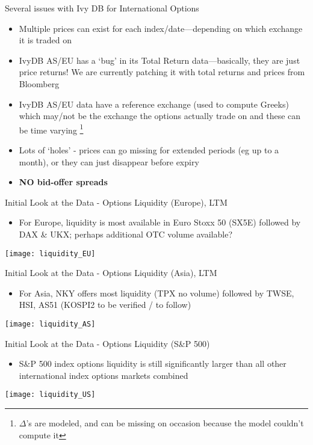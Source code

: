 \documentclass{beamer}
\begin{document}
\begin{frame}{Several issues with Ivy DB for International Options}
\begin{itemize}
\item Multiple prices can exist for each index/date---depending on which exchange it is traded on
\item IvyDB AS/EU has a `bug' in its Total Return data---basically, they are just price returns! We are currently patching it with total returns and prices from Bloomberg
\item IvyDB AS/EU data have a reference exchange (used to compute Greeks) which may/not be the exchange the options actually trade on and these can be time varying \footnote{$\Delta$'s are modeled, and can be missing on occasion because the model couldn't compute it}
\item Lots of `holes' - prices can go missing for extended periods (eg up to a month), or they can just disappear before expiry
\item {\bf NO bid-offer spreads}
\end{itemize}
\end{frame}

\begin{frame}{Initial Look at the Data - Options Liquidity (Europe), LTM}

\begin{itemize}
\item For Europe, liquidity is most available in Euro Stoxx 50 (SX5E) followed by DAX \& UKX; perhaps additional OTC volume available?
\end{itemize}

\texttt{[image: liquidity\_EU]}

\end{frame}


\begin{frame}{Initial Look at the Data - Options Liquidity (Asia), LTM}


\begin{itemize}
\item For Asia, NKY offers most liquidity (TPX no volume) followed by TWSE, HSI, AS51 (KOSPI2 to be verified / to follow)
\end{itemize}

\texttt{[image: liquidity\_AS]}

\end{frame}


\begin{frame}{Initial Look at the Data - Options Liquidity (S\&P 500)}


\begin{itemize}
\item S\&P 500 index options liquidity is still significantly larger than all other international index options markets combined
\end{itemize}

\texttt{[image: liquidity\_US]}

\end{frame}
\end{document}
